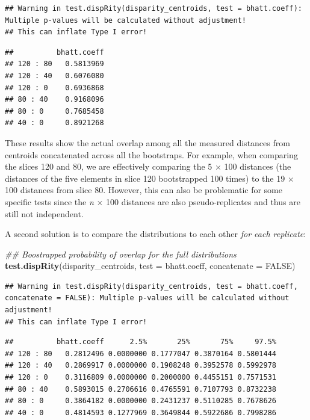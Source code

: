 \documentclass[]{book}
\newenvironment{Shaded}{\begin{snugshade}}{\end{snugshade}}
\newcommand{\CommentTok}[1]{\textcolor[rgb]{0.56,0.35,0.01}{\textit{#1}}}
\newcommand{\DataTypeTok}[1]{\textcolor[rgb]{0.13,0.29,0.53}{#1}}
\newcommand{\KeywordTok}[1]{\textcolor[rgb]{0.13,0.29,0.53}{\textbf{#1}}}
\newcommand{\NormalTok}[1]{#1}
\newcommand{\OtherTok}[1]{\textcolor[rgb]{0.56,0.35,0.01}{#1}}
\begin{document}
\begin{verbatim}
## Warning in test.dispRity(disparity_centroids, test = bhatt.coeff): Multiple p-values will be calculated without adjustment!
## This can inflate Type I error!
\end{verbatim}

\begin{verbatim}
##          bhatt.coeff
## 120 : 80   0.5813969
## 120 : 40   0.6076080
## 120 : 0    0.6936868
## 80 : 40    0.9168096
## 80 : 0     0.7685458
## 40 : 0     0.8921268
\end{verbatim}

These results show the actual overlap among all the measured distances from centroids concatenated across all the bootstraps.
For example, when comparing the slices 120 and 80, we are effectively comparing the 5 \(\times\) 100 distances (the distances of the five elements in slice 120 bootstrapped 100 times) to the 19 \(\times\) 100 distances from slice 80.
However, this can also be problematic for some specific tests since the \emph{n} \(\times\) 100 distances are also pseudo-replicates and thus are still not independent.

A second solution is to compare the distributions to each other \emph{for each replicate}:

\begin{Shaded}
\begin{Highlighting}[]
\CommentTok{## Boostrapped probability of overlap for the full distributions}
\KeywordTok{test.dispRity}\NormalTok{(disparity_centroids, }\DataTypeTok{test =}\NormalTok{ bhatt.coeff,}
              \DataTypeTok{concatenate =} \OtherTok{FALSE}\NormalTok{)}
\end{Highlighting}
\end{Shaded}

\begin{verbatim}
## Warning in test.dispRity(disparity_centroids, test = bhatt.coeff, concatenate = FALSE): Multiple p-values will be calculated without adjustment!
## This can inflate Type I error!
\end{verbatim}

\begin{verbatim}
##          bhatt.coeff      2.5%       25%       75%     97.5%
## 120 : 80   0.2812496 0.0000000 0.1777047 0.3870164 0.5801444
## 120 : 40   0.2869917 0.0000000 0.1908248 0.3952578 0.5992978
## 120 : 0    0.3116809 0.0000000 0.2000000 0.4455151 0.7571531
## 80 : 40    0.5893015 0.2706616 0.4765591 0.7107793 0.8732238
## 80 : 0     0.3864182 0.0000000 0.2431237 0.5110285 0.7678626
## 40 : 0     0.4814593 0.1277969 0.3649844 0.5922686 0.7998286
\end{verbatim}
\end{document}
